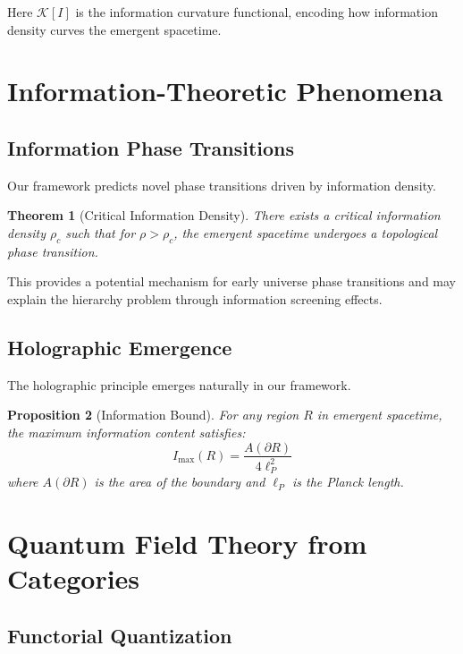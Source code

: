 \documentclass[12pt,a4paper]{article}
\newtheorem{theorem}{Theorem}[section]
\newtheorem{proposition}[theorem]{Proposition}
\begin{document}
Here $\mathcal{K}[I]$ is the information curvature functional, encoding how information density curves the emergent spacetime.

\section{Information-Theoretic Phenomena}

\subsection{Information Phase Transitions}

Our framework predicts novel phase transitions driven by information density.

\begin{theorem}[Critical Information Density]
There exists a critical information density $\rho_c$ such that for $\rho > \rho_c$, the emergent spacetime undergoes a topological phase transition.
\end{theorem}

This provides a potential mechanism for early universe phase transitions and may explain the hierarchy problem through information screening effects.

\subsection{Holographic Emergence}

The holographic principle emerges naturally in our framework.

\begin{proposition}[Information Bound]
For any region $R$ in emergent spacetime, the maximum information content satisfies:
\begin{equation}
I_{\max}(R) = \frac{A(\partial R)}{4\ell_P^2}
\end{equation}
where $A(\partial R)$ is the area of the boundary and $\ell_P$ is the Planck length.
\end{proposition}

\section{Quantum Field Theory from Categories}

\subsection{Functorial Quantization}
\end{document}
